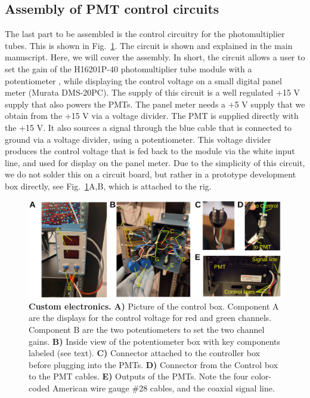 \documentclass[10pt,letterpaper]{article}
\begin{document}
\subsection{Assembly of PMT control circuits}
The last part to be assembled is the control circuitry for the photomultiplier tubes. This is shown in Fig.~\ref{sfig12}. The circuit is shown and explained in the main manuscript. Here, we will cover the assembly. In short, the circuit allows a user to set the gain of the H16201P-40 photomultiplier tube module with a potentiometer \cite{Hamamatsu2024}, while displaying the control voltage on a small digital panel meter (Murata DMS-20PC). The supply of this circuit is a well regulated +15 V supply that also powers the PMTs. The panel meter needs a +5 V supply that we obtain from the +15 V via a voltage divider. The PMT is supplied directly with the +15 V. It also sources a signal through the blue cable that is connected to ground via a voltage divider, using a potentiometer. This voltage divider produces the control voltage that is fed back to the module via the white input line, and used for display on the panel meter. Due to the simplicity of this circuit, we do not solder this on a circuit board, but rather in a prototype development box directly, see Fig.~\ref{sfig12}A,B, which is attached to the rig.
%
\begin{figure}[t]
    \includegraphics[width=\textwidth]{sfig12.jpg}
  \caption{{\bf Custom electronics.} \textbf{A)} Picture of the control box. Component A are the displays for the control voltage for red and green channels. Component B are the two potentiometers to set the two channel gains. \textbf{B)} Inside view of the potentiometer box with key components labeled (see text). \textbf{C)} Connector attached to the controller box before plugging into the PMTs. \textbf{D)} Connector from the Control box to the PMT cables. \textbf{E)} Outputs of the PMTs. Note the four color-coded American wire gauge \#28 cables, and the coaxial signal line\cite{Hamamatsu2024}.}
  \label{sfig12}
\end{figure}
\end{document}
